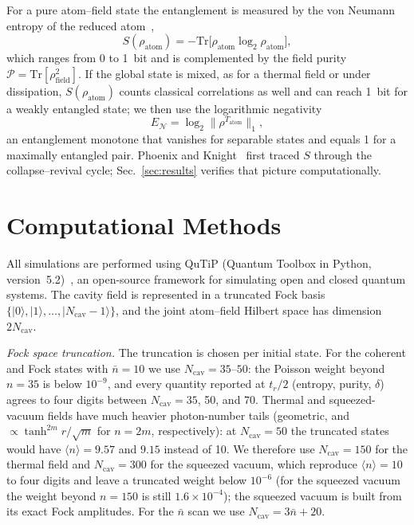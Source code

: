 \documentclass{iopjournal}
\begin{document}
For a pure atom--field state the entanglement is measured by the von Neumann entropy of the reduced atom~\cite{nielsen2000},
\begin{equation}
S(\rho_{\text{atom}}) = -\text{Tr}\big[\rho_{\text{atom}} \log_2 \rho_{\text{atom}}\big],
\label{eq:entropy}
\end{equation}
which ranges from 0 to 1~bit and is complemented by the field purity $\mathcal{P} = \text{Tr}[\rho_{\text{field}}^2]$. If the global state is mixed, as for a thermal field or under dissipation, $S(\rho_{\text{atom}})$ counts classical correlations as well and can reach 1~bit for a weakly entangled state; we then use the logarithmic negativity~\cite{vidal2002, plenio2005}
\begin{equation}
E_{\mathcal{N}} = \log_2 \big\| \rho^{T_{\text{atom}}} \big\|_1,
\label{eq:logneg}
\end{equation}
an entanglement monotone that vanishes for separable states and equals 1 for a maximally entangled pair. Phoenix and Knight~\cite{phoenix1988, phoenix1991} first traced $S$ through the collapse--revival cycle; Sec.~\ref{sec:results} verifies that picture computationally.


\section{Computational Methods}
\label{sec:methods}

All simulations are performed using QuTiP (Quantum Toolbox in Python, version~5.2)~\cite{johansson2012, johansson2013}, an open-source framework for simulating open and closed quantum systems. The cavity field is represented in a truncated Fock basis $\{|0\rangle, |1\rangle, \ldots, |N_{\text{cav}}-1\rangle\}$, and the joint atom--field Hilbert space has dimension $2N_{\text{cav}}$.

\textit{Fock space truncation.} The truncation is chosen per initial state. For the coherent and Fock states with $\bar{n} = 10$ we use $N_{\text{cav}} = 35$--$50$: the Poisson weight beyond $n = 35$ is below $10^{-9}$, and every quantity reported at $t_r/2$ (entropy, purity, $\delta$) agrees to four digits between $N_{\text{cav}} = 35$, 50, and 70. Thermal and squeezed-vacuum fields have much heavier photon-number tails (geometric, and $\propto \tanh^{2m}r/\sqrt{m}$ for $n = 2m$, respectively): at $N_{\text{cav}} = 50$ the truncated states would have $\langle n\rangle = 9.57$ and $9.15$ instead of 10. We therefore use $N_{\text{cav}} = 150$ for the thermal field and $N_{\text{cav}} = 300$ for the squeezed vacuum, which reproduce $\langle n\rangle = 10$ to four digits and leave a truncated weight below $10^{-6}$ (for the squeezed vacuum the weight beyond $n = 150$ is still $1.6\times10^{-4}$); the squeezed vacuum is built from its exact Fock amplitudes. For the $\bar{n}$ scan we use $N_{\text{cav}} = 3\bar{n} + 20$.
\end{document}
